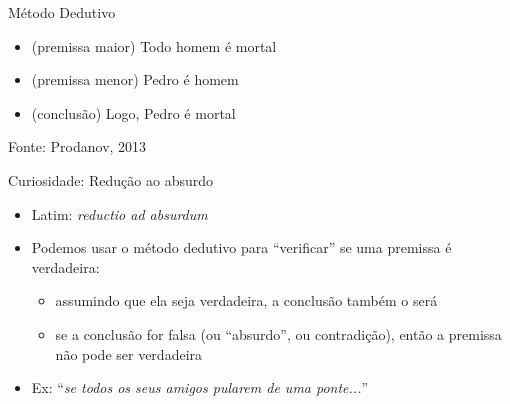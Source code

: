 \documentclass{beamer}
\begin{document}
\begin{frame}{Método Dedutivo}
  \begin{example}
    \begin{itemize}
    \item (premissa maior) Todo homem é mortal
    \item (premissa menor) Pedro é homem
    \item (conclusão) Logo, Pedro é mortal
    \end{itemize}
  \end{example}

  \vfill
  Fonte: Prodanov, 2013
\end{frame}

\begin{frame}{Curiosidade: Redução ao absurdo}
  \begin{itemize}
  \item Latim: {\em reductio ad absurdum}
  \item Podemos usar o método dedutivo para ``verificar'' se uma
    premissa é verdadeira:
    \begin{itemize}
    \item \alert{assumindo que ela seja verdadeira}, a conclusão também o será
    \item se a conclusão for falsa (ou ``absurdo'', ou contradição),
      então a premissa não pode ser verdadeira
    \end{itemize}
  \item Ex: ``{\em se todos os seus amigos pularem de uma ponte...}''
  \end{itemize}
\end{frame}



\end{document}
